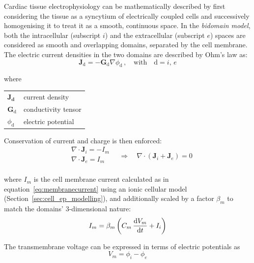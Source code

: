 \vspace{0.2cm}
Cardiac tissue electrophysiology can be mathematically described by first considering the tissue as a syncytium of electrically coupled cells and successively homogenising it to treat it as a smooth, continuous space. In the \textit{bidomain model}, both the intracellular (subscript $i$) and the extracellular (subscript $e$) spaces are considered as smooth and overlapping domains, separated by the cell membrane. The electric current densities in the two domains are described by Ohm's law as:
%
\begin{equation}\label{eq:ohmslaw}
    \mathbf{J}_{\text{d}} = -\mathbf{G}_{\text{d}}\nabla\phi_{\text{d}}\,,\quad\text{with}\quad \text{d}=i,\,e
\end{equation}

\noindent
where

\vspace{0.2cm}
\begin{tabular}{ll}
    $\mathbf{\mathbf{J}_{\text{d}}}$ & current density \\
    $\mathbf{G}_{\text{d}}$ & conductivity tensor \\
    $\phi_{\text{d}}$ & electric potential \\
\end{tabular}

\vspace{0.2cm}\noindent
Conservation of current and charge is then enforced:
%
\begin{equation}
    \begin{aligned}
        & \nabla\cdot\mathbf{J}_i = -I_m \\
        & \nabla\cdot\mathbf{J}_e =  I_m \\
    \end{aligned}\quad\Rightarrow\quad \nabla\cdot(\mathbf{J}_i+\mathbf{J}_e) = 0
\end{equation}

\noindent
where $I_m$ is the cell membrane current calculated as in equation~\eqref{eq:membranecurrent} using an ionic cellular model (Section~\ref{sec:cell_ep_modelling}), and additionally scaled by a factor $\beta_m$ to match the domains' $3$-dimensional nature:
%
\begin{equation}\label{eq:membranecurrentsc}
    I_m = \beta_m\left(C_m\,\dfrac{\mathrm{d}{V_m}}{\mathrm{d}{t}} + I_i\right)
\end{equation}

\noindent
The transmembrane voltage can be expressed in terms of electric potentials as
%
\begin{equation}
    V_m = \phi_i - \phi_e
\end{equation}

